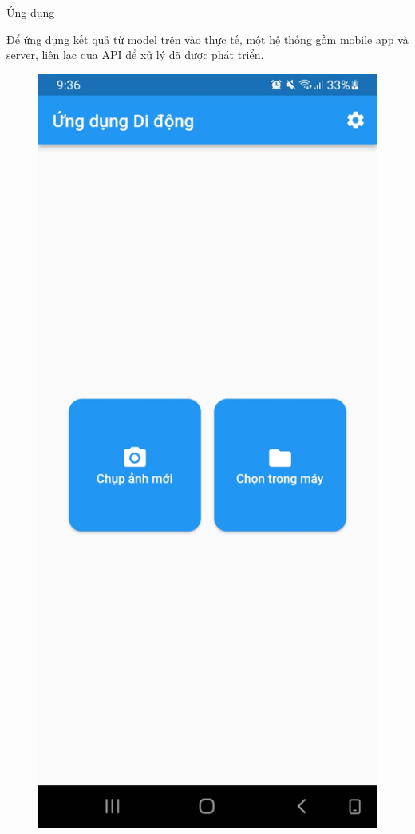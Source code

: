 \documentclass{beamer}
\begin{document}
\begin{frame}[allowframebreaks]{Ứng dụng}
	
	Để ứng dụng kết quả từ model trên vào thực tế, một hệ thống gồm mobile app và server, liên lạc qua API để xử lý đã được phát triển.

	\framebreak

	\begin{figure}[H]
		\centering
		\includegraphics[scale=0.1]{images/screenshot1.jpg}

\end{figure}
\end{frame}
\end{document}
